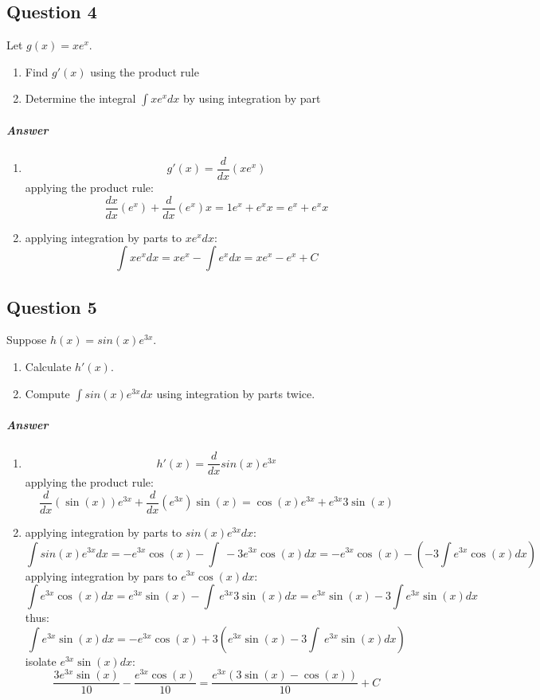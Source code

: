 \documentclass{article}
\begin{document}
\subsection{Question 4}
Let $ g(x) = x e^x $.
\begin{enumerate}
    \item Find $ g'(x) $ using the product rule
    \item Determine the integral $ \int x e^x dx $ by using integration by part
\end{enumerate}
\subparagraph{Answer}
\begin{enumerate}
    \item $$g'(x) = \frac{d}{dx}(x e^x)$$
    applying the product rule:
    $$\frac{dx}{dx}(e^x) + \frac{d}{dx}(e^x)x = 1e^x+e^x x  = e^x + e^xx $$
    \item applying integration by parts to $ x e^xdx $:
    $$\int x e^x dx = xe^x-\int e^x dx = xe^x- e^x + C$$
\end{enumerate}

\subsection{Question 5}
Suppose $ h(x) = sin(x) e^{3x} $.
\begin{enumerate}
    \item Calculate $ h'(x) $.
    \item Compute $ \int sin(x) e^{3x} dx $ using integration by parts twice.
\end{enumerate}
\subparagraph{Answer}
\begin{enumerate}
    \item  $$h'(x) = \frac{d}{dx} sin(x)e^{3x}$$
    applying the product rule:
    $$\frac{d}{dx}(\sin (x))e^{3x}+\frac{d}{dx}(e^{3x})\sin (x) = \cos (x)e^{3x}+e^{3x} 3\sin (x)$$
    \item applying integration by parts to $ sin(x) e^{3x}dx$:
    $$\int sin(x) e^{3x} dx = -e^{3x}\cos (x)-\int \:-3e^{3x}\cos (x)dx = -e^{3x}\cos (x)-\left(-3 \int e^{3x}\cos (x)dx\right)$$
    applying integration by pars to $ e^{3x}\cos (x)dx$:
    $$ \int e^{3x}\cos (x)dx = e^{3x}\sin (x)-\int \:e^{3x} 3\sin (x)dx = e^{3x}\sin (x)-3 \int e^{3x}\sin (x)dx$$
    thus:
    $$\int e^{3x}\sin (x)dx=-e^{3x}\cos (x)+3\left(e^{3x}\sin (x)-3 \int \:e^{3x}\sin (x)dx\right)$$
    isolate $e^{3x}\sin \left(x\right)dx$:
    $$\frac{3e^{3x}\sin \left(x\right)}{10}-\frac{e^{3x}\cos \left(x\right)}{10}= \frac{e^{3x} (3\sin (x) - \cos (x))}{10}+C$$
\end{enumerate}
\end{document}
